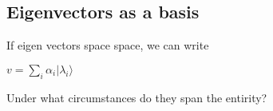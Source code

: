 
\subsection{Eigenvectors as a basis}

If eigen vectors space space, we can write

\(v=\sum_i \alpha_i | \lambda_i\rangle \)

Under what circumstances do they span the entirity?

